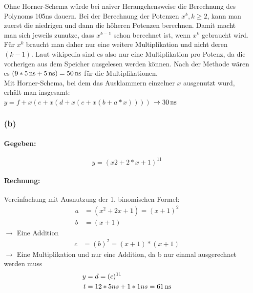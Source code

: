 \documentclass[11pt,a4paper]{article}
\begin{document}
Ohne Horner-Schema würde bei naiver Herangehensweise die Berechnung des Polynoms 105ns dauern.
Bei der Berechnung der Potenzen $x^k, k\geq2$, kann man zuerst die niedrigen und dann die höheren Potenzen berechnen. Damit macht man sich jeweils zunutze, dass $x^{k-1}$ schon berechnet ist, wenn $x^{k}$ gebraucht wird. Für $x^{k}$ braucht man daher nur eine weitere Multiplikation und nicht deren $(k-1)$.
Laut wikipedia sind es also nur eine Multiplikation pro Potenz, da die vorherigen aus dem Speicher ausgelesen werden können\cite{wiki:1}.
Nach der Methode wären es $(9*\unit[5]{ns} + \unit[5]{ns}) = \unit[50]{ns}$ für die Multiplikationen.\\

Mit Horner-Schema, bei dem das Ausklammern einzelner $x$ ausgenutzt wurd, erhält man insgesamt:\\
$y = f + x (e + x ( d + x ( c + x ( b + a * x ))))$
$\rightarrow \unit[30]{ns}$

\newpage

\subsubsection{(b)} %

\paragraph{Gegeben:}
\begin{equation}
y = (x2+2*x+1)^{11}
\end{equation}

\paragraph{Rechnung:}

Vereinfachung mit Ausnutzung der 1. binomischen Formel:
\begin{align}
a &= (x^2+2x+1)=(x+1)^2\\
b &= (x+1)
\end{align}
$\rightarrow$ Eine Addition
\begin{align}
c &= (b)^2=(x+1)*(x+1)
\end{align}
$\rightarrow$ Eine Multiplikation und nur eine Addition, da b nur einmal ausgerechnet werden muss\\
\begin{align}
y &= d=(c)^{11}\\
t &= 12*5ns + 1*1ns = \unit[61]{ns}
\end{align}
\end{document}
